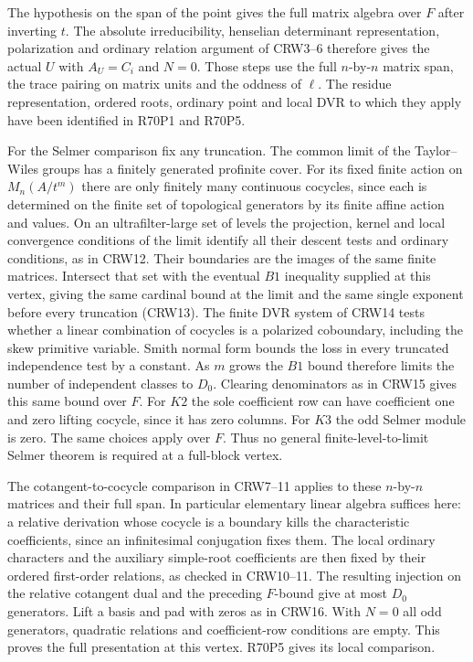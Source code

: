 The hypothesis on the span of the point gives the full matrix
algebra over $F$ after inverting $t$. The absolute irreducibility,
henselian determinant representation, polarization and ordinary
relation argument of CRW3--6 therefore gives the actual $U$ with
$A_U=C_i$ and $N=0$. Those steps use the full $n$-by-$n$ matrix
span, the trace pairing on matrix units and the oddness of $\ell$.
The residue representation, ordered roots, ordinary point and local
DVR to which they apply have been identified in R70P1 and R70P5.

For the Selmer comparison fix any truncation. The common limit
of the Taylor--Wiles groups has a finitely generated profinite
cover. For its fixed finite action on $M_n(A/t^m)$ there are
only finitely many continuous cocycles, since each is determined
on the finite set of topological generators by its finite affine
action and values. On an ultrafilter-large set of levels the
projection, kernel and local convergence conditions of the limit
identify all their descent tests and ordinary conditions, as in
CRW12. Their boundaries are the images of the same finite matrices.
Intersect that set with the eventual $B1$ inequality supplied at
this vertex, giving the same cardinal bound at the limit and
the same single exponent before every truncation (CRW13).
The finite DVR system of CRW14 tests whether a linear combination
of cocycles is a polarized coboundary, including the skew primitive
variable. Smith normal form bounds the loss in every truncated
independence test by a constant. As $m$ grows the $B1$ bound
therefore limits the number of independent classes to $D_0$.
Clearing denominators as in CRW15 gives this same bound over $F$.
For $K2$ the sole coefficient row can have coefficient one and
zero lifting cocycle, since it has zero columns. For $K3$ the
odd Selmer module is zero. The same choices apply over $F$.
Thus no general finite-level-to-limit Selmer theorem is required
at a full-block vertex.

The cotangent-to-cocycle comparison in CRW7--11 applies to these
$n$-by-$n$ matrices and their full span. In particular elementary
linear algebra suffices here: a relative derivation whose cocycle
is a boundary kills the characteristic coefficients, since an
infinitesimal conjugation fixes them. The local ordinary characters
and the auxiliary simple-root coefficients are then fixed by
their ordered first-order relations, as checked in CRW10--11.
The resulting injection on the relative cotangent dual and the
preceding $F$-bound give at most $D_0$ generators. Lift a basis
and pad with zeros as in CRW16. With $N=0$ all odd generators,
quadratic relations and coefficient-row conditions are empty.
This proves the full presentation at this vertex. R70P5 gives
its local comparison.

